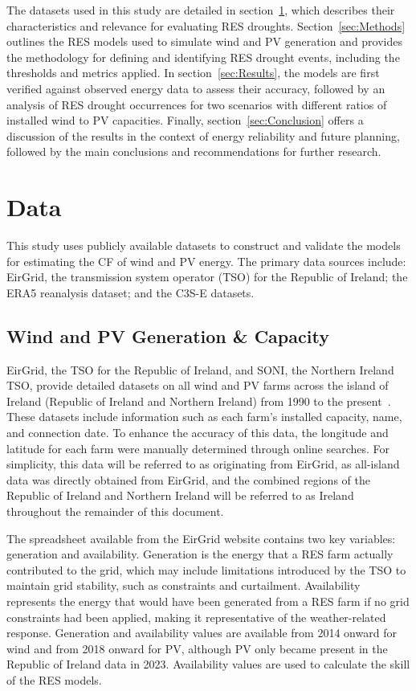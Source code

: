 \documentclass[a4paper, 11pt]{article}
\begin{document}
The datasets used in this study are detailed in section~\ref{sec:Data}, which describes their characteristics and relevance for evaluating RES droughts. Section~\ref{sec:Methods} outlines the RES models used to simulate wind and PV generation and provides the methodology for defining and identifying RES drought events, including the thresholds and metrics applied. In section~\ref{sec:Results}, the models are first verified against observed energy data to assess their accuracy, followed by an analysis of RES drought occurrences for two scenarios with different ratios of installed wind to PV capacities. Finally, section~\ref{sec:Conclusion} offers a discussion of the results in the context of energy reliability and future planning, followed by the main conclusions and recommendations for further research.

\section{Data}
\label{sec:Data}

This study uses publicly available datasets to construct and validate the models for estimating the CF of wind and PV energy. The primary data sources include: EirGrid, the transmission system operator (TSO) for the Republic of Ireland; the ERA5 reanalysis dataset; and the C3S-E datasets.

\subsection{Wind and PV Generation \& Capacity}
\label{sec:eirgrid}

EirGrid, the TSO for the Republic of Ireland, and SONI, the Northern Ireland TSO, provide detailed datasets on all wind and PV farms across the island of Ireland (Republic of Ireland and Northern Ireland) from 1990 to the present~\cite{eirgrid2023spreadsheet}. These datasets include information such as each farm’s installed capacity, name, and connection date. To enhance the accuracy of this data, the longitude and latitude for each farm were manually determined through online searches. For simplicity, this data will be referred to as originating from EirGrid, as all-island data was directly obtained from EirGrid, and the combined regions of the Republic of Ireland and Northern Ireland will be referred to as Ireland throughout the remainder of this document.

The spreadsheet available from the EirGrid website contains two key variables: generation and availability. Generation is the energy that a RES farm actually contributed to the grid, which may include limitations introduced by the TSO to maintain grid stability, such as constraints and curtailment. Availability represents the energy that would have been generated from a RES farm if no grid constraints had been applied, making it representative of the weather-related response. Generation and availability values are available from 2014 onward for wind and from 2018 onward for PV, although PV only became present in the Republic of Ireland data in 2023. Availability values are used to calculate the skill of the RES models. 
\end{document}
